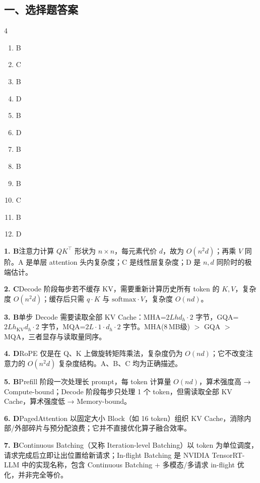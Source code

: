 \documentclass[11pt,a4paper]{article}
\begin{document}
\subsection*{\heiti 一、选择题答案}

\begin{multicols}{4}
\begin{enumerate}[label=\textbf{\arabic*.},leftmargin=*,itemsep=0.1em,parsep=0pt,topsep=0pt]
  \item B
  \item C
  \item B
  \item D
  \item B
  \item D
  \item B
  \item B
  \item B
  \item C
  \item B
  \item D
\end{enumerate}
\end{multicols}

\vspace{0.3cm}
\noindent\textbf{1. B}\quad 注意力计算 $QK^{\top}$ 形状为 $n\times n$，每元素代价 $d$，故为 $O(n^2 d)$；再乘 $V$ 同阶。A 是单层 attention 头内复杂度；C 是线性层复杂度；D 是 $n,d$ 同阶时的极端估计。

\noindent\textbf{2. C}\quad Decode 阶段每步若不缓存 KV，需要重新计算历史所有 token 的 $K,V$，复杂度 $O(n^2 d)$；缓存后只需 $q\cdot K$ 与 $\mathrm{softmax}\cdot V$，复杂度 $O(nd)$。

\noindent\textbf{3. B}\quad 单步 Decode 需要读取全部 KV Cache：MHA=$2Lh d_h\cdot2$ 字节，GQA=$2Lh_{\mathrm{KV}}d_h\cdot2$ 字节，MQA=$2L\cdot1\cdot d_h\cdot2$ 字节。MHA(8\,MB级) $>$ GQA $>$ MQA，三者显存与读取量同序。

\noindent\textbf{4. D}\quad RoPE 仅是在 Q、K 上做旋转矩阵乘法，复杂度仍为 $O(nd)$；它不改变注意力的 $O(n^2 d)$ 复杂度结构。A、B、C 均为正确描述。

\noindent\textbf{5. B}\quad Prefill 阶段一次处理长 prompt，每 token 计算量 $O(nd)$，算术强度高 → Compute-bound；Decode 阶段每步只处理 1 个 token，但需读取全部 KV Cache，算术强度低 → Memory-bound。

\noindent\textbf{6. D}\quad PagedAttention 以固定大小 Block（如 16 token）组织 KV Cache，消除内部/外部碎片与预分配浪费；它并不直接优化算子融合效率。

\noindent\textbf{7. B}\quad Continuous Batching（又称 Iteration-level Batching）以 token 为单位调度，请求完成后立即让出位置给新请求；In-flight Batching 是 NVIDIA TensorRT-LLM 中的实现名称，包含 Continuous Batching + 多模态/多请求 in-flight 优化，并非完全等价。
\end{document}
